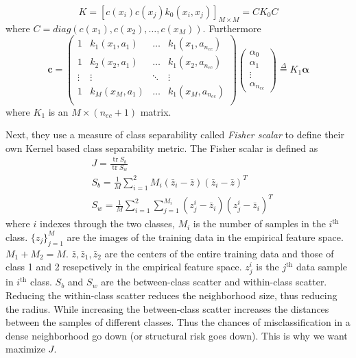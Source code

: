 \documentclass[11pt]{article}
\begin{document}
\[K=[c(x_i)c(x_j)k_0(x_i,x_j)]_{M\times M}=CK_0C\]
where $C=diag(c(x_1),c(x_2),\dotsc,c(x_M))$. Furthermore
\begin{equation}
    \label{eq:alk}
    \mathbf{c}=\begin{pmatrix}
        1&k_1(x_1,a_1)&\dots&k_1(x_1,a_{n_{ec}})\\
        1&k_2(x_2,a_1)&\dots&k_1(x_2,a_{n_{ec}})\\
        \vdots&\vdots&\ddots&\vdots\\
        1&k_M(x_M,a_1)&\dots&k_1(x_M,a_{n_{ec}})\\
        \end{pmatrix}\begin{pmatrix}
            \alpha_0\\
            \alpha_1\\
            \vdots\\
            \alpha_{n_{ec}}
    \end{pmatrix}\stackrel{\Delta}{=}K_1\mathbf{\alpha}
\end{equation}
where $K_1$ is an $M\times(n_{ec}+1)$ matrix.\par
Next, they use a measure of class separability called {\em Fisher scalar} to
define their own Kernel based class separability metric. The Fisher scalar is
defined as
\begin{align}
    &J=\frac{\operatorname{tr} S_b}{\operatorname{tr} S_w}\\
    &S_b=\frac{1}{M}\sum_{i=1}^2M_i(\bar{z}_i-\bar{z})(\bar{z}_i-\bar{z})^T\\
    &S_w=\frac{1}{M}\sum_{i=1}^2\sum_{j=1}^{M_i}(z_j^i-\bar{z}_i)(z_j^i-\bar{z}_i)^T
\end{align}
where $i$ indexes through the two classes, $M_i$ is the number of samples in the
$i^\text{th}$ class. $\{z_j\}_{j=1}^M$ are the images of the training data in
the empirical feature space. $M_1+M_2=M$. $\bar{z},\bar{z}_1,\bar{z}_2$ are the
centers of the entire training data and those of class 1 and 2 resepctively in
the empirical feature space. $z_j^i$ is the $j^\text{th}$ data sample in
$i^\text{th}$ class. $S_b$ and $S_w$ are the between\nobreakdash-class scatter and
within\nobreakdash-class scatter. Reducing the within\nobreakdash-class scatter reduces the neighborhood
size, thus reducing the radius. While increasing the between\nobreakdash-class scatter
increases the distances between the samples of different classes. Thus the
chances of misclassification in a dense neighborhood go down (or structural risk
goes down). This is why we want maximize $J$.
\end{document}
